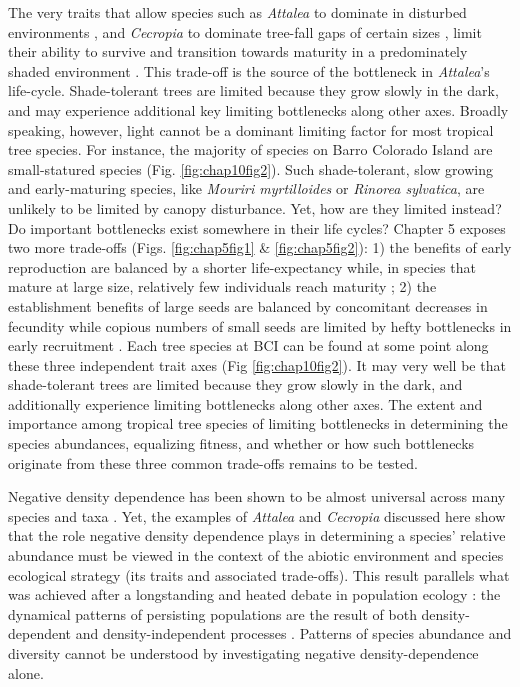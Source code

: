 \documentclass[b5paper,justified]{tufte-book} %
\begin{document}
\begin{fullwidth}
\hspace{.5cm} The very traits that allow species such as \textit{Attalea} to dominate in disturbed environments \citep{Araus1994, Souza2004}, and \textit{Cecropia} to dominate tree-fall gaps of certain sizes \citep{Brokaw1987}, limit their ability to survive and transition towards maturity in a predominately shaded environment \citep[e.g.][]{Sterck2011}. This trade-off  is the source of the bottleneck in \textit{Attalea}'s life-cycle. Shade-tolerant trees are limited because they grow slowly in the dark, and may experience additional key limiting bottlenecks along other axes. Broadly speaking, however, light cannot be a dominant limiting factor for most tropical tree species. For instance, the majority of species on Barro Colorado Island are small-statured species (Fig. \ref{fig:chap10fig2}). Such shade-tolerant, slow growing and early-maturing species, like \textit{Mouriri myrtilloides} or \textit{Rinorea sylvatica}, are unlikely to be limited by canopy disturbance. Yet, how are they limited instead? Do important bottlenecks exist somewhere in their life cycles? Chapter 5 exposes two more trade-offs (Figs. \ref{fig:chap5fig1} \& \ref{fig:chap5fig2}): 1) the benefits of early reproduction are balanced by a shorter life-expectancy while, in species that mature at large size, relatively few individuals reach maturity \citep{Kohyama1993, Metcalf2009}; 2) the establishment benefits of large seeds are balanced by concomitant decreases in fecundity while copious numbers of small seeds are limited by hefty bottlenecks in early recruitment \citep{Alvarez-Buylla1994, Muller-Landau2010}. Each tree species at BCI can be found at some point along these three independent trait axes (Fig \ref{fig:chap10fig2}). It may very well be that shade-tolerant trees are limited because they grow slowly in the dark, and additionally experience limiting bottlenecks along other axes. The extent and importance among tropical tree species of limiting bottlenecks in determining the species abundances, equalizing fitness, and whether or how such bottlenecks originate from these three common trade-offs remains to be tested.

Negative density dependence has been shown to be almost universal across many species and taxa \citep{Harms2000a, Brook2006, Comita2014}. Yet, the examples of \textit{Attalea} and \textit{Cecropia} discussed here show that the role negative density dependence plays in determining a species' relative abundance must be viewed in the context of the abiotic environment and species ecological strategy (its traits and associated trade-offs). This result parallels what was achieved after a longstanding and heated debate in population ecology \citep[see e.g.][]{Turchin1995}: the dynamical patterns of persisting populations are the result of both density-dependent and density-independent processes \citep{Hassell1986}. Patterns of species abundance and diversity cannot be understood by investigating negative density-dependence alone.
 

\end{fullwidth}
\end{document}
